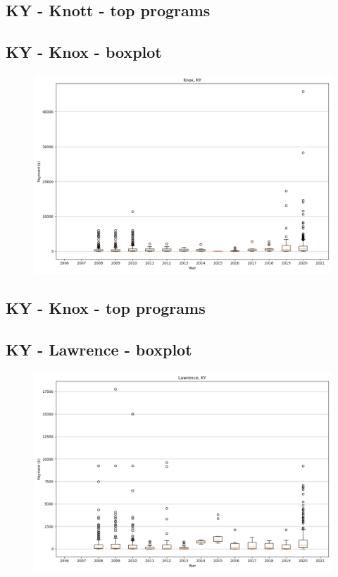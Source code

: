 \subsection*{KY - Knott - top programs}

\newpage
\subsection*{KY - Knox - boxplot}
\begin{figure}[h]
\centering
\includegraphics[width=7in]{../output/boxplots/counties/Knox-KY_boxplot.png}
\end{figure}


\subsection*{KY - Knox - top programs}

\newpage
\subsection*{KY - Lawrence - boxplot}
\begin{figure}[h]
\centering
\includegraphics[width=7in]{../output/boxplots/counties/Lawrence-KY_boxplot.png}
\end{figure}


